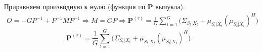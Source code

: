 \documentclass[11pt]{article}
\begin{document}
Приравняем производную к нулю (функция по $\mathbf{P}$ выпукла).
\begin{equation*}
\begin{gathered}
O = -GP^{-1}+P^{-1}MP^{-1} \Rightarrow M =GP \Rightarrow \mathbf{P}^{(\tau)} = \frac{1}{G} \sum_{t=1}^G \Big( \Sigma_{S_t|X_t} +  \mu_{S_t|X_t}  (\mu_{S_t|X_t})^H \Big)
\end{gathered}
\end{equation*}
\begin{equation}
\mathbf{P}^{(\tau)} = \frac{1}{G} \sum_{t=1}^G \Big( \Sigma_{S_t|X_t} +  \mu_{S_t|X_t}  (\mu_{S_t|X_t})^H \Big)
\end{equation}
\clearpage
\begin{center}
\fontsize{16}{20}\selectfont {}
\end{center}
\begin{center}
\fontsize{14}{18}\selectfont {}
\end{center}
\begin{center}
\fontsize{14}{18}\selectfont {}
\end{center}
\begin{center}
\fontsize{14}{18}\selectfont {}
\end{center}
\begin{center}
\fontsize{14}{18}\selectfont {}
\end{center}
\clearpage
\begin{center}
\fontsize{16}{20}\selectfont {}
\end{center}
\end{document}
